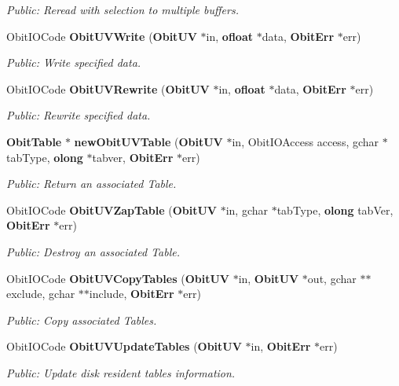 \begin{CompactItemize}
\begin{CompactList}\small\item\em Public: Reread with selection to multiple buffers. \item\end{CompactList}\item 
Obit\-IOCode {\bf Obit\-UVWrite} ({\bf Obit\-UV} $\ast$in, {\bf ofloat} $\ast$data, {\bf Obit\-Err} $\ast$err)
\begin{CompactList}\small\item\em Public: Write specified data. \item\end{CompactList}\item 
Obit\-IOCode {\bf Obit\-UVRewrite} ({\bf Obit\-UV} $\ast$in, {\bf ofloat} $\ast$data, {\bf Obit\-Err} $\ast$err)
\begin{CompactList}\small\item\em Public: Rewrite specified data. \item\end{CompactList}\item 
{\bf Obit\-Table} $\ast$ {\bf new\-Obit\-UVTable} ({\bf Obit\-UV} $\ast$in, Obit\-IOAccess access, gchar $\ast$tab\-Type, {\bf olong} $\ast$tabver, {\bf Obit\-Err} $\ast$err)
\begin{CompactList}\small\item\em Public: Return an associated Table. \item\end{CompactList}\item 
Obit\-IOCode {\bf Obit\-UVZap\-Table} ({\bf Obit\-UV} $\ast$in, gchar $\ast$tab\-Type, {\bf olong} tab\-Ver, {\bf Obit\-Err} $\ast$err)
\begin{CompactList}\small\item\em Public: Destroy an associated Table. \item\end{CompactList}\item 
Obit\-IOCode {\bf Obit\-UVCopy\-Tables} ({\bf Obit\-UV} $\ast$in, {\bf Obit\-UV} $\ast$out, gchar $\ast$$\ast$exclude, gchar $\ast$$\ast$include, {\bf Obit\-Err} $\ast$err)
\begin{CompactList}\small\item\em Public: Copy associated Tables. \item\end{CompactList}\item 
Obit\-IOCode {\bf Obit\-UVUpdate\-Tables} ({\bf Obit\-UV} $\ast$in, {\bf Obit\-Err} $\ast$err)
\begin{CompactList}\small\item\em Public: Update disk resident tables information. \item\end{CompactList}\item 

\end{CompactItemize}
